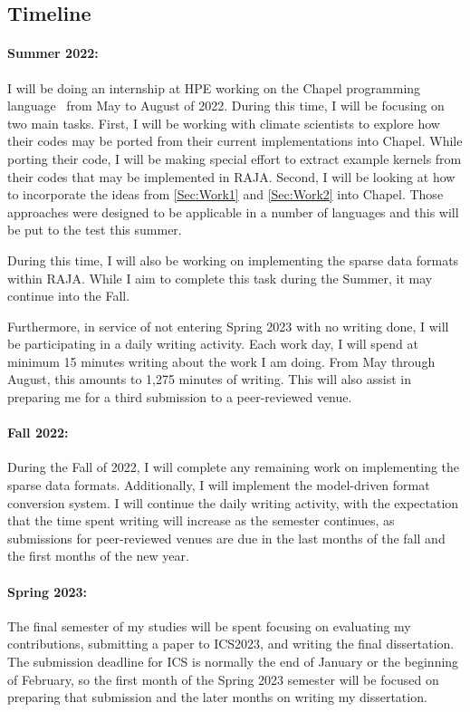 \documentclass{article}
\begin{document}
\subsection{Timeline}

\paragraph{Summer 2022:} 
I will be doing an internship at HPE working on the Chapel programming language~\cite{diaconescu2007approach} from May to August of 2022.
During this time, I will be focusing on two main tasks.
First, I will be working with climate scientists to explore how their codes may be ported from their current implementations into Chapel. 
While porting their code, I will be making special effort to extract example kernels from their codes that may be implemented in RAJA.
Second, I will be looking at how to incorporate the ideas from \ref{Sec:Work1} and \ref{Sec:Work2} into Chapel. 
Those approaches were designed to be applicable in a number of languages and this will be put to the test this summer.

During this time, I will also be working on implementing the sparse data formats within RAJA. While I aim to complete this task during the Summer, it may continue into the Fall.

Furthermore, in service of not entering Spring 2023 with no writing done, I will be participating in a daily writing activity.
Each work day, I will spend at minimum 15 minutes writing about the work I am doing.
From May through August, this amounts to 1,275 minutes of writing.
This will also assist in preparing me for a third submission to a peer-reviewed venue.
\paragraph{Fall 2022:} 
During the Fall of 2022, I will complete any remaining work on implementing the sparse data formats.
Additionally, I will implement the model-driven format conversion system.
I will continue the daily writing activity, with the expectation that the time spent writing will increase as the semester continues, as submissions for peer-reviewed venues are due in the last months of the fall and the first months of the new year. 

\paragraph{Spring 2023:}
The final semester of my studies will be spent focusing on evaluating my contributions, submitting a paper to ICS2023, and writing the final dissertation. 
The submission deadline for ICS is normally the end of January or the beginning of February, so the first month of the Spring 2023 semester will be focused on preparing that submission and the later months on writing my dissertation.
\end{document}
